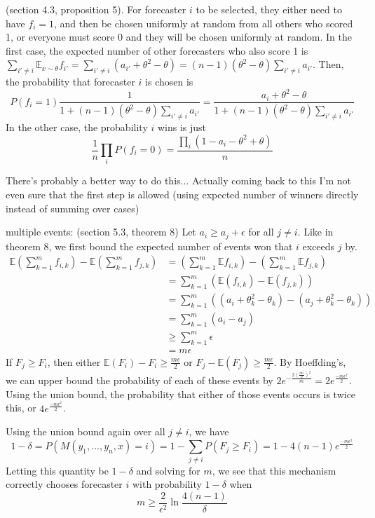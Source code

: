 \documentclass[letterpaper,12pt]{article}
\newcommand{\E}{\mathbb{E}}
\newcommand{\1}{\mathbbm{1}}
\begin{document}
(section 4.3, proposition 5).  For forecaster $i$ to be selected, they either need to have $f_i = 1$, and then be chosen uniformly at random from all others who scored 1, or everyone must score 0 and they will be chosen uniformly at random. In the first case, the expected number of other forecasters who also score 1 is $\sum_{i' \neq i} \E_{x \sim \theta} f_{i'} = \sum_{i' \neq i} (a_{i'} + \theta^2 - \theta) = (n-1) (\theta^2 - \theta) \sum_{i' \neq i} a_{i'}$. Then, the probability that forecaster $i$ is chosen is 
\[
  P(f_i = 1) \frac{1}{1 + (n-1) (\theta^2 - \theta) \sum_{i' \neq i} a_{i'}} = \frac{a_i +\theta^2 - \theta}{1 + (n-1) (\theta^2 - \theta) \sum_{i' \neq i} a_{i'}}
\]
In the other case, the probability $i$ wins is just 
\[
  \frac{1}{n} \prod_{i} P(f_i = 0) = \frac{\prod_i (1 - a_i -\theta^2 + \theta)}{n}
\]

There's probably a better way to do this... Actually coming back to this I'm not even sure that the first step is allowed (using expected number of winners directly instead of summing over cases)

multiple events: (section 5.3, theorem 8)
Let $a_i \geq a_j + \epsilon$ for all $j\neq i$. Like in theorem 8, we first bound the expected number of events won that $i$ exceeds $j$ by. 
\begin{align*}
  \E \left( \sum_{k=1}^m f_{i, k}\right) - \E \left( \sum_{k=1}^m f_{j, k}\right)
  &= \left( \sum_{k=1}^m \E f_{i, k}\right) - \left( \sum_{k=1}^m \E f_{j, k}\right)\\
  &= \sum_{k=1}^m \left(\E (f_{i, k}) - \E (f_{j, k})\right)\\
  &= \sum_{k=1}^m \left((a_i + \theta_k^2 - \theta_k) - (a_j + \theta_k^2 - \theta_k)\right)\\
  &= \sum_{k=1}^m \left(a_i - a_j\right)\\
  &\geq \sum_{k=1}^m \epsilon\\
  &=m \epsilon
\end{align*}
If $F_j \geq F_i$, then either $\E(F_i) - F_i \geq \frac{m \epsilon}{2}$ or $F_j - \E(F_j) \geq \frac{m \epsilon}{2}$. By Hoeffding's, we can upper bound the probability of each of these events by $2 e^{-\frac{2 (\frac{m \epsilon}{2})^2}{m}} = 2 e^{\frac{- m \epsilon^2}{2}}$. Using the union bound, the probability that either of those events occurs is twice this, or $4 e^{\frac{- m \epsilon^2}{2}}$.

Using the union bound again over all $j \neq i$, we have 
\[
1 - \delta = P(M(y_1, ..., y_n, x) = i) = 1 - \sum_{j \neq i} P(F_j \geq F_i) = 1 - 4 (n-1) e^{\frac{- m \epsilon^2}{2}}
\]
Letting this quantity be $1 - \delta$ and solving for $m$, we see that this mechanism correctly chooses forecaster $i$ with probability $1 - \delta$ when 
\[ m \geq \frac{2}{\epsilon^2} \ln \frac{4(n-1)}{\delta} \]



\end{document}
